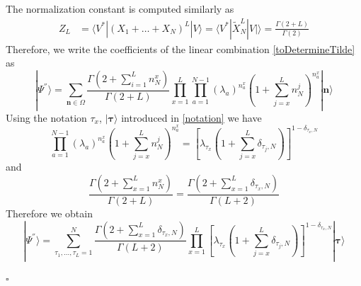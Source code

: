 \documentclass[10pt]{article}
\numberwithin{equation}{section}
\numberwithin{equation}{subsection}
\begin{document}
The normalization constant is computed similarly as 
\begin{align*}
	Z_{L}&=\langle V^{*}|(X_{1}+\ldots+X_{N})^{L}|V\rangle=\langle V^{*}|\widetilde{X}_{N}^{L}|V|\rangle=
	\frac{\Gamma(2+L)}{\Gamma(2)}
\end{align*}
Therefore, we write the coefficients of the linear combination \eqref{toDetermineTilde} as 
\begin{equation}\label{resulEsteady}
	|\Psi^{''}\rangle= \sum_{\bm{n}\in \Omega}\frac{\Gamma(2+\sum_{i=1}^{L}n_{N}^{x})}{\Gamma(2+L)}\prod_{x=1}^{L}\prod_{a=1}^{N-1}\left(\lambda_{a}\right)^{n_{a}^{x}}\left(1+\sum_{j=x}^{L}n_{N}^{j}\right)^{n_{a}^{x}}|\bm{n}\rangle
\end{equation}
Using the notation $\tau_{x}$, $|\bm{\tau}\rangle $ introduced in \eqref{notation} we have 
\begin{equation}
	\prod_{a=1}^{N-1}\left(\lambda_{a}\right)^{n_{a}^{x}}\left(1+\sum_{j=x}^{L}n_{N}^{j}\right)^{n_{a}^{x}}=\left[\lambda_{\tau_{x}}\left(1+\sum_{j=x}^{L}\delta_{\tau_{j},N}\right)\right]^{1-\delta_{\tau_{x},N}}
\end{equation}
and 
\begin{equation}
	\frac{\Gamma(2+\sum_{x=1}^{L}n_{N}^{x})}{\Gamma(2+L)}=\frac{\Gamma\left(2+\sum_{x=1}^{L}\delta_{\tau_{x},N}\right)}{\Gamma\left(L+2\right)}
\end{equation}
Therefore we obtain
\begin{equation}
|\Psi^{''}\rangle=\sum_{\tau_{1},\ldots,\tau_{L}=1}^{N}\frac{\Gamma\left(2+\sum_{x=1}^{L}\delta_{\tau_{x},N}\right)}{\Gamma\left(L+2\right)}\prod_{x=1}^{L}\left[\lambda_{\tau_{x}}\left(1+\sum_{j=x}^{L}\delta_{\tau_{j},N}\right)\right]^{1-\delta_{\tau_{x},N}}|\mathbf{\bm{\tau}}\rangle
\end{equation}
\begin{flushright}
$\square$
\end{flushright}
\end{document}
